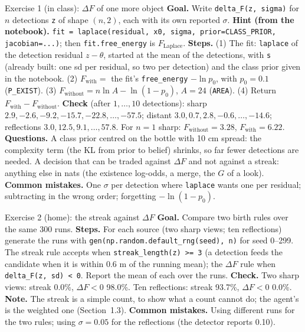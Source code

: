\documentclass[11pt]{article}
\begin{document}
\begin{labhelp}{Exercise 1 (in class): $\Delta F$ of one more object}
\textbf{Goal.} Write \texttt{delta\_F(z, sigma)} for $n$ detections \texttt{z} of shape $(n,2)$, each with its own reported $\sigma$. \textbf{Hint (from the notebook).} \texttt{fit = laplace(residual, x0, sigma, prior=CLASS\_PRIOR, jacobian=...)}; then \texttt{fit.free\_energy} is $F_{\text{Laplace}}$. \textbf{Steps.} (1) The fit: \texttt{laplace} of the detection residual $z-\theta$, started at the mean of the detections, with \texttt{s} (already built: one sd per residual, so two per detection) and the class prior given in the notebook. (2) $F_{\text{with}}=$ the fit's \texttt{free\_energy} $-\ln p_0$, with $p_0=0.1$ (\texttt{P\_EXIST}). (3) $F_{\text{without}}=n\ln A-\ln(1-p_0)$, $A=24$ (\texttt{AREA}). (4) Return $F_{\text{with}}-F_{\text{without}}$. \textbf{Check} (after $1,\dots,10$ detections): sharp $2.9,-2.6,-9.2,-15.7,-22.8,\ldots,-57.5$; distant $3.0,0.7,2.8,-0.6,\ldots,-14.6$; reflections $3.0,12.5,9.1,\ldots,57.8$. For $n=1$ sharp: $F_{\text{without}}=3.28$, $F_{\text{with}}=6.22$. \textbf{Questions.} A class prior centred on the bottle with 10 cm spread: the complexity term (the KL from prior to belief) shrinks, so far fewer detections are needed. A decision that can be traded against $\Delta F$ and not against a streak: anything else in nats (the existence log-odds, a merge, the $G$ of a look). \textbf{Common mistakes.} One $\sigma$ per detection where \texttt{laplace} wants one per residual; subtracting in the wrong order; forgetting $-\ln(1-p_0)$.
\end{labhelp}

\begin{labhelp}{Exercise 2 (home): the streak against $\Delta F$}
\textbf{Goal.} Compare two birth rules over the same 300 runs. \textbf{Steps.} For each source (two sharp views; ten reflections) generate the runs with \texttt{gen(np.random.default\_rng(seed), n)} for seed 0--299. The streak rule accepts when \texttt{streak\_length(z) >= 3} (a detection feeds the candidate when it is within 0.6 m of the running mean); the $\Delta F$ rule when \texttt{delta\_F(z, sd) < 0}. Report the mean of each over the runs. \textbf{Check.} Two sharp views: streak 0.0\%, $\Delta F<0$ 98.0\%. Ten reflections: streak 93.7\%, $\Delta F<0$ 0.0\%. \textbf{Note.} The streak is a simple count, to show what a count cannot do; the agent's is the weighted one (Section~1.3). \textbf{Common mistakes.} Using different runs for the two rules; using $\sigma=0.05$ for the reflections (the detector reports 0.10).
\end{labhelp}
\end{document}
